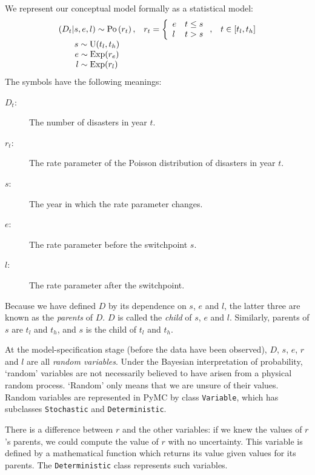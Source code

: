 We represent our conceptual model formally as a statistical model:
\begin{equation}
    \begin{array}{ccc}
        (D_t | s, e, l) \sim \textup{Po}\left(r_t\right), & r_t=\left\{\begin{array}{ll}
            e & t\le s\\ l & t>s
            \end{array}\right.,&t\in[t_l,t_h]\\
        s\sim \textup{U}(t_l, t_h)\\
        e\sim \textup{Exp}(r_e)\\
        l\sim \textup{Exp}(r_l)        
    \end{array}
    \label{disastermodel} 
\end{equation}
The symbols have the following meanings:
\begin{description}
    \item[$D_t$:] The number of disasters in year $t$.
    \item[$r_t$:] The rate parameter of the Poisson distribution of disasters in year $t$.
    \item[$s$:] The year in which the rate parameter changes.
    \item[$e$:] The rate parameter before the switchpoint $s$.
    \item[$l$:] The rate parameter after the switchpoint.
\end{description}
Because we have defined $D$ by its dependence on $s$, $e$ and $l$, the latter three are known as the \emph{parents} of $D$. $D$ is called the \emph{child} of $s$, $e$ and $l$. Similarly, parents of $s$ are $t_l$ and $t_h$, and $s$ is the child of $t_l$ and $t_h$.

At the model-specification stage (before the data have been observed), $D$, $s$, $e$, $r$ and $l$ are all \emph{random variables}. Under the Bayesian interpretation of probability, `random' variables are not necessarily believed to have arisen from a physical random process. `Random' only means that we are unsure of their values. Random variables are represented in PyMC by class \texttt{Variable}, which has subclasses \texttt{Stochastic} and \texttt{Deterministic}.

There is a difference between $r$ and the other variables: if we knew the values of $r$'s parents, we could compute the value of $r$ with no uncertainty. This variable is defined by a mathematical function which returns its value given values for its parents. The \texttt{Deterministic} class represents such variables.

